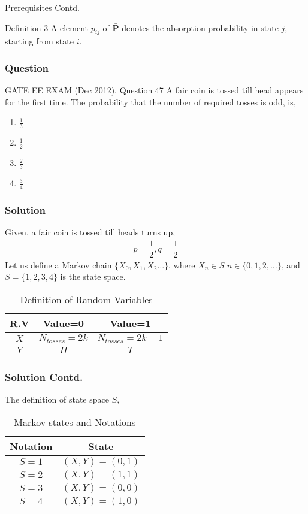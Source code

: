 \documentclass{beamer}
\renewcommand{\vec}[1]{\mathbf{#1}}
\let\vec\mathbf
\begin{document}
\begin{frame}{Prerequisites Contd.}
\begin{block}{Definition 3}
A element $\bar p_{ij}$ of $\vec{\bar P}$ denotes the absorption probability in state $j$, starting from state $i$.
\end{block}
\end{frame}
\begin{frame}
    \frametitle{Question}
    \begin{block}{GATE EE EXAM (Dec 2012), Question 47}
   A fair coin is tossed till head appears for the first time. The probability that the number of required tosses is odd, is, \\
\begin{enumerate}
    \item $\frac{1}{3}$
    \item $\frac{1}{2}$
    \item $\frac{2}{3}$
    \item $\frac{3}{4}$
\end{enumerate}
  \end{block}
\end{frame}
\begin{frame}
\frametitle{Solution}
    Given, a fair coin is tossed till heads turns up,
\begin{align}
p=\dfrac{1}{2},q=\dfrac{1}{2}
\label{eq6}
\end{align}
    Let us define a Markov chain $\{X_{0},X_{1},X_{2}\dots\}$, where $X_{n}\in S$ \vee $n\in\{0,1,2,\dots\}$, and $S=\{1,2,3,4\}$ is the state space.
   \begin{table}[h!]
\centering
\caption{Definition of Random Variables}
\label{table:1}
\begin{tabular}{|c|c|c|}
    \hline
    R.V & Value=0 & Value=1 \\
    \hline
    $X$ & $N_{tosses}=2k$ & $N_{tosses}=2k-1$ \\[1ex]
    \hline
    $Y$ & $H$ & $T$ \\[1ex]
    \hline
\end{tabular}
\end{table}    
\end{frame}
\begin{frame}
 \frametitle{Solution Contd.}
 The definition of state space $S$,
      \begin{table}[h!]
\centering
\caption{Markov states and Notations }
\label{table:2}
\begin{tabular}{|c|c|}
    \hline
    Notation & State \\
    \hline
    $S=1$ & $(X,Y)=(0,1)$ \\[1ex]
    \hline
    $S=2$ & $(X,Y)=(1,1)$\\[1ex]
    \hline
    $S=3$ & $(X,Y)=(0,0)$\\[1ex]
    \hline
    $S=4$ & $(X,Y)=(1,0)$\\[1ex]
    \hline
\end{tabular}
\end{table}
\end{frame}
\end{document}
